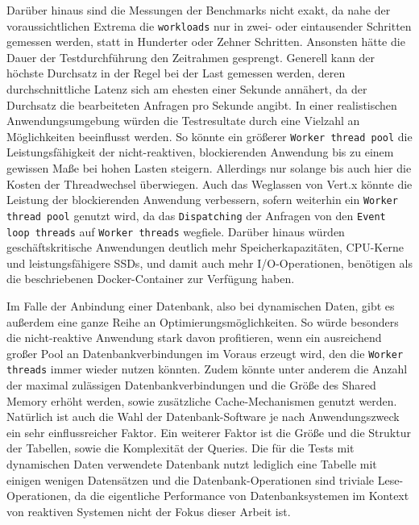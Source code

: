 Darüber hinaus sind die Messungen der Benchmarks nicht exakt, da nahe der voraussichtlichen Extrema die \verb|workloads|
nur in zwei- oder eintausender Schritten gemessen werden, statt in Hunderter oder Zehner Schritten.
Ansonsten hätte die Dauer der Testdurchführung den Zeitrahmen gesprengt.
Generell kann der höchste Durchsatz in der Regel bei der Last gemessen werden, deren durchschnittliche Latenz sich am ehesten
einer Sekunde annähert, da der Durchsatz die bearbeiteten Anfragen pro Sekunde angibt.
\newline\newline
In einer realistischen Anwendungsumgebung würden die Testresultate durch eine Vielzahl an Möglichkeiten beeinflusst werden.
So könnte ein größerer \verb|Worker thread pool| die Leistungsfähigkeit der nicht-reaktiven, blockierenden
Anwendung bis zu einem gewissen Maße bei hohen Lasten steigern. Allerdings nur solange bis auch hier die Kosten der Threadwechsel
überwiegen. Auch das Weglassen von Vert.x könnte die Leistung der blockierenden Anwendung verbessern, sofern weiterhin
ein \verb|Worker thread pool| genutzt wird, da das \verb|Dispatching| der Anfragen von den \verb|Event loop threads| auf
\verb|Worker threads| wegfiele. Darüber hinaus würden geschäftskritische Anwendungen deutlich mehr Speicherkapazitäten, CPU-Kerne und
leistungsfähigere SSDs, und damit auch mehr I/O-Operationen, benötigen als die beschriebenen Docker-Container zur Verfügung haben.

Im Falle der Anbindung einer Datenbank, also bei dynamischen Daten, gibt es außerdem eine ganze Reihe an Optimierungsmöglichkeiten.
So würde besonders die nicht-reaktive Anwendung stark davon profitieren, wenn ein ausreichend großer Pool an Datenbankverbindungen
im Voraus erzeugt wird, den die \verb|Worker threads| immer wieder nutzen könnten.
Zudem könnte unter anderem die Anzahl der maximal zulässigen
Datenbankverbindungen und die Größe des Shared Memory erhöht werden, sowie zusätzliche Cache-Mechanismen genutzt werden.
Natürlich ist auch die Wahl der Datenbank-Software je nach Anwendungszweck ein sehr einflussreicher Faktor.
\newline\newline
Ein weiterer Faktor ist die Größe und die Struktur der Tabellen, sowie die Komplexität der Queries.
Die für die Tests mit dynamischen Daten verwendete Datenbank nutzt lediglich eine Tabelle mit einigen wenigen Datensätzen und die
Datenbank-Operationen sind triviale Lese-Operationen,
da die eigentliche Performance von Datenbanksystemen im Kontext von reaktiven Systemen nicht der Fokus dieser Arbeit ist.

